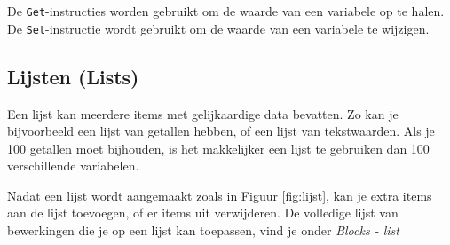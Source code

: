 
De \texttt{Get}-instructies worden gebruikt om de waarde van een variabele op te halen. De \texttt{Set}-instructie wordt gebruikt om de waarde van een variabele te wijzigen.

\subsection{Lijsten (Lists)}
Een lijst kan meerdere items met gelijkaardige data bevatten. Zo kan je bijvoorbeeld een lijst van getallen hebben, of een lijst van tekstwaarden. Als je 100 getallen moet bijhouden, is het makkelijker een lijst te gebruiken dan 100 verschillende variabelen.

Nadat een lijst wordt aangemaakt zoals in Figuur \ref{fig:lijst}, kan je extra items aan de lijst toevoegen, of er items uit verwijderen. De volledige lijst van bewerkingen die je op een lijst kan toepassen, vind je onder \emph{Blocks - list}



